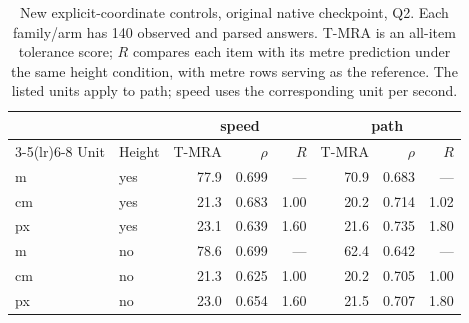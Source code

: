\documentclass[11pt]{article}
\begin{document}
\begin{table}[t]
\centering\small
\setlength{\tabcolsep}{4pt}
\caption{New explicit-coordinate controls, original native checkpoint, Q2.
Each family/arm has 140 observed and parsed answers. T-MRA is an all-item
tolerance score; $R$ compares each item with its metre prediction under the
same height condition, with metre rows serving as the reference.
The listed units apply to path; speed uses the corresponding unit per second.}
\label{tab:explicit_unit_controls}
\begin{tabular}{llrrrrrr}
\toprule
 & & \multicolumn{3}{c}{speed} & \multicolumn{3}{c}{path} \\
\cmidrule(lr){3-5}\cmidrule(lr){6-8}
Unit & Height & T-MRA & $\rho$ & $R$ & T-MRA & $\rho$ & $R$ \\
\midrule
m & yes & 77.9 & 0.699 & --- & 70.9 & 0.683 & --- \\
cm & yes & 21.3 & 0.683 & 1.00 & 20.2 & 0.714 & 1.02 \\
px & yes & 23.1 & 0.639 & 1.60 & 21.6 & 0.735 & 1.80 \\
m & no & 78.6 & 0.699 & --- & 62.4 & 0.642 & --- \\
cm & no & 21.3 & 0.625 & 1.00 & 20.2 & 0.705 & 1.00 \\
px & no & 23.0 & 0.654 & 1.60 & 21.5 & 0.707 & 1.80 \\
\bottomrule
\end{tabular}
\end{table}
\end{document}
